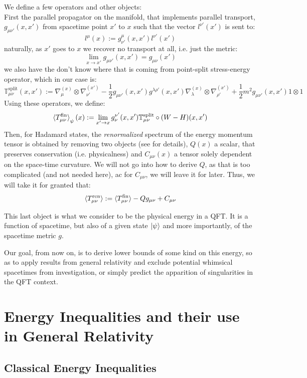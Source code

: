 \documentclass[a4paper,11pt]{article}
\numberwithin{equation}{section}
\theoremstyle{definition}
\begin{document}
    We define a few operators and other objects:\\
    First the parallel propagator on the manifold, that implements parallel transport, $g_{\mu\nu'}(x,x')$ from spacetime point $x'$ to $x$ such that the vector $l^{\nu'}(x')$ is sent to:
    $$l^{\mu}(x):=g^\mu_{\nu'}(x,x')l^{\nu'}(x')$$
    naturally, as $x'$ goes to $x$ we recover no transport at all, i.e. just the metric:
    $$\lim_{x\to x'} g_{\mu\nu'}(x,x')=g_{\mu\nu}(x')$$
    we also have the \color{red}don't know where that is coming from\color{black} point-split stress-energy operator, which in our case is:
    $$\mathbb{T}^\mathrm{split}_{\mu\nu}(x,x'):=\nabla^{(x)}_\mu\otimes\nabla^{(x')}_{\nu'}-\frac{1}{2}g_{\mu\nu'}(x,x')g^{\lambda\rho'}(x,x')\nabla_\lambda^{(x)}\otimes\nabla_{\rho'}^{(x')}+\frac{1}{2}m^2g_{\mu\nu'}(x,x')1\otimes 1$$
    Using these operators, we define:
    $$\braket{T^\mathrm{fin}_{\mu\nu}}_\psi(x):=\lim_{x'\to x} g_\nu^{\nu'}(x,x')\mathbb{T}^\mathrm{split}_{\mu\nu}\circ(W-H)(x,x')$$
    Then, for Hadamard states, the \emph{renormalized} spectrum of the energy momentum tensor is obtained by removing two objects (see \cite{QCRenorm} for details), $Q(x)$ a scalar, that preserves conservation (i.e. physicalness) and $C_{\mu\nu}(x)$ a tensor solely dependent on the space-time curvature. We will not go into how to derive $Q$, as that is too complicated (and not needed here), ac for $C_{\mu\nu}$, we will leave it for later. Thus, we will take it for granted that:
    \begin{equation}
    \braket{T^\mathrm{ren}_{\mu\nu}}:=\braket{T^\mathrm{fin}_{\mu\nu}}-Qg_{\mu\nu} + C_{\mu\nu}
    \end{equation}
    
    This last object is what we consider to be the physical energy in a QFT. It is a function of spacetime, but also of a given state $\ket{\psi}$ and more importantly, of the spacetime metric $g$.

    Our goal, from now on, is to derive lower bounds of some kind on this energy, so as to apply results from general relativity and exclude potential whimsical spacetimes from investigation, or simply predict the apparition of singularities in the QFT context.
    
\section{Energy Inequalities and their use in General Relativity}
\subsection{Classical Energy Inequalities}
\end{document}
